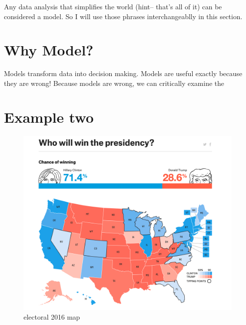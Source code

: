 \documentclass[]{book}
\begin{document}
Any data analysis that simplifies the world (hint-- that's all of it) can be considered a model. So I will use those phrases interchangeablly in this section.

\hypertarget{why-model}{%
\section{Why Model?}\label{why-model}}

Models transform data into decision making. Models are useful exactly because they are wrong! Because models are wrong, we can critically examine the

\hypertarget{example-two}{%
\section{Example two}\label{example-two}}

\begin{figure}
\centering
\includegraphics{images/map.png}
\caption{electoral 2016 map}
\end{figure}
\end{document}
